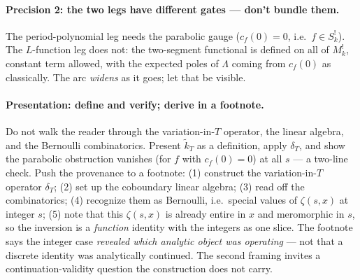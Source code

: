 \documentclass[11pt]{article}
\newcommand{\tk}{\widetilde{k}_T}
\begin{document}
\paragraph{Precision 2: the two legs have different gates --- don't bundle them.}
The period-polynomial leg needs the parabolic gauge ($c_f(0)=0$, i.e.\ $f\in S_k^!$).
The $L$-function leg does not: the two-segment functional is defined on all of
$M_k^!$, constant term allowed, with the expected poles of $\Lambda$ coming from
$c_f(0)$ as classically. The arc \emph{widens} as it goes; let that be visible.

\paragraph{Presentation: define and verify; derive in a footnote.}
Do not walk the reader through the variation-in-$T$ operator, the linear algebra,
and the Bernoulli combinatorics. Present $\tk$ as a definition, apply $\delta_T$, and
show the parabolic obstruction vanishes (for $f$ with $c_f(0)=0$) at all $s$ --- a
two-line check. Push the provenance to a footnote: (1) construct the
variation-in-$T$ operator $\delta_T$; (2) set up the coboundary linear algebra;
(3) read off the combinatorics; (4) recognize them as Bernoulli, i.e.\ special
values of $\zeta(s,x)$ at integer $s$; (5) note that this $\zeta(s,x)$ is already
entire in $x$ and meromorphic in $s$, so the inversion is a \emph{function} identity
with the integers as one slice. The footnote says the integer case \emph{revealed
which analytic object was operating} --- not that a discrete identity was
analytically continued. The second framing invites a continuation-validity question
the construction does not carry.
\end{document}
